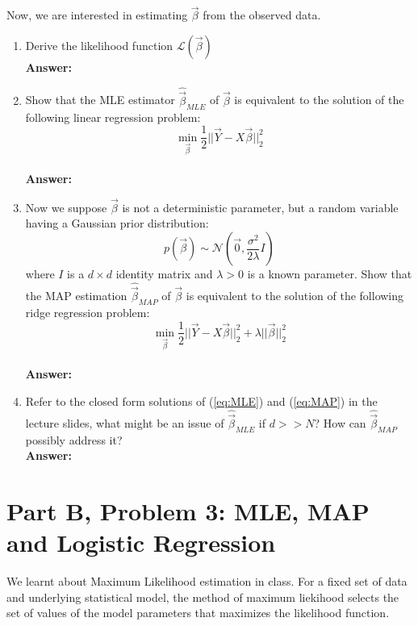 \documentclass{article}
\begin{document}
Now, we are interested in estimating $\vec{\beta}$ from the observed data.
\begin{enumerate}
	\item Derive the likelihood function $\mathcal{L}(\vec{\beta})$
	\\\textbf{Answer:}
	
	\item Show that the MLE estimator $\hat{\vec{\beta}}_{MLE}$ of $\vec{\beta}$ is equivalent to the solution of the following linear regression problem:
	\begin{equation}
	\label{eq:MLE}
	\min_{\vec{\beta}}\frac{1}{2}||\vec{Y}-X\vec{\beta}||_2^2
	\end{equation}
	\\\textbf{Answer:}
	
	\item Now we suppose $\vec{\beta}$ is not a deterministic parameter, but a random variable having a Gaussian prior distribution:
	$$p(\vec{\beta}) \sim \mathcal{N}(\vec{0},\frac{\sigma^2}{2\lambda}I)$$
	where $I$ is a $d \times d$ identity matrix and $\lambda>0$ is a known parameter. Show that the MAP estimation $\hat{\vec{\beta}}_{MAP}$ of $\vec{\beta}$ is equivalent to the solution of the following ridge regression problem:
	\begin{equation}
	\label{eq:MAP}
	\min_{\vec{\beta}} \frac{1}{2} ||\vec{Y}-X\vec{\beta}||_2^2+\lambda||\vec{\beta}||_2^2
	\end{equation}
	\\\textbf{Answer:}
	
	\item Refer to the closed form solutions of (\ref{eq:MLE}) and (\ref{eq:MAP}) in the lecture slides, what might be an issue of $\hat{\vec{\beta}}_{MLE}$ if $d>>N$? How can $\hat{\vec{\beta}}_{MAP}$ possibly address it?
	\\\textbf{Answer:}
	
\end{enumerate}


\newpage

\section*{Part B, Problem 3: MLE, MAP and Logistic Regression}

We learnt about Maximum Likelihood estimation in class. For a fixed set of data and underlying statistical model, the method of maximum liekihood selects the set of values of the model parameters that maximizes the likelihood function.
\end{document}
